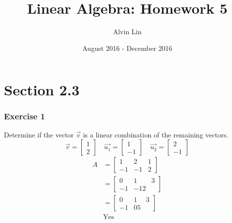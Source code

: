 \documentclass[letterpaper, 12pt]{math}
\title{Linear Algebra: Homework 5}
\author{Alvin Lin}
\date{August 2016 - December 2016}
\begin{document}
\maketitle

\section*{Section 2.3}

\subsubsection*{Exercise 1}
Determine if the vector \( \vec{v} \) is a linear combination of the remaining
vectors.
\[ \vec{v} = \begin{bmatrix}1 \\ 2\end{bmatrix} \quad
  \vec{u_1} = \begin{bmatrix}1 \\ -1\end{bmatrix} \quad
  \vec{u_2} = \begin{bmatrix}2 \\ -1\end{bmatrix} \]
\begin{align*}
  A &= \begin{bmatrix}
    1 & 2 & 1 \\
    -1 & -1 & 2
  \end{bmatrix} \\
  &= \begin{bmatrix}
    0 & 1 & 3 \\
    -1 & -1 2
  \end{bmatrix} \\
  &= \begin{bmatrix}
    0 & 1 & 3 \\
    -1 & 0 5
  \end{bmatrix} \\
  & \text{Yes}
\end{align*}
\end{document}
